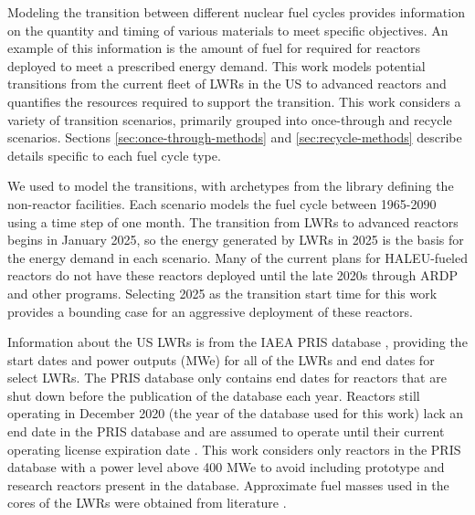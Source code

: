 Modeling the transition between different nuclear fuel cycles provides 
information on the quantity and timing of various materials to meet 
specific objectives. An example of this information is the 
amount of fuel for required for reactors deployed to meet a 
prescribed energy demand. 
This work models potential transitions from the 
current fleet of \glspl{LWR} in the US to advanced reactors and 
quantifies the 
resources required to support the transition. 
This work considers a variety of transition scenarios, primarily grouped 
into once-through and recycle scenarios. Sections \ref{sec:once-through-methods}
and \ref{sec:recycle-methods} describe details specific to each 
fuel cycle type.

We used \Cyclus \cite{huff_fundamental_2016} to model the transitions, 
with archetypes from the \Cycamore library \cite{carlsen_cycamore_2014}
defining the non-reactor facilities. Each scenario models the fuel 
cycle between 1965-2090 using a time step of one month. 
The transition from \glspl{LWR} 
to advanced reactors begins in January 2025, so the energy generated by 
\glspl{LWR} in 2025 is the basis for the energy demand in each scenario.  
Many of the 
current plans for \gls{HALEU}-fueled reactors do not have these reactors 
deployed until the late 2020s \cite{nichol_current_2021} through \gls{ARDP} 
and other programs. Selecting 2025 as the transition 
start time for this work provides a bounding case for 
an aggressive deployment of these reactors. 

Information about the US \glspl{LWR} is from the \gls{IAEA} \gls{PRIS} 
database \cite{noauthor_power_1989}, providing the start dates and 
power outputs (MWe) for all of the \glspl{LWR} and end 
dates for select \glspl{LWR}. The \gls{PRIS} database only contains end dates 
for reactors that are shut down before the publication of the 
database each year. Reactors still operating in December 2020  
(the year of the database used for this work) lack an end date 
in the \gls{PRIS} database and are assumed to operate until 
their current operating license expiration date 
\cite{nuclear_energy_institute_us_2021}. This work considers only 
reactors in the \gls{PRIS} database with a power level above 400 MWe 
to avoid including prototype and research reactors present in the database. 
Approximate fuel masses used in the cores of the \glspl{LWR} were obtained 
from literature \cite{todreas_nuclear_2012,cacuci_handbook_2010}. 

